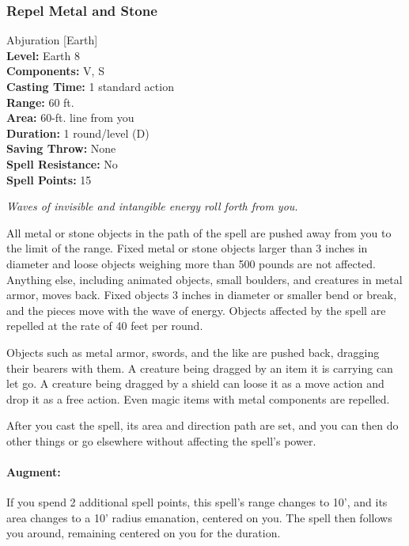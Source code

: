 \subsubsection{Repel Metal and Stone}
\label{Spell:RepelMetalAndStone}
Abjuration [Earth]
\\ \textbf{Level:} Earth 8
\\ \textbf{Components:} V, S
\\ \textbf{Casting Time:} 1 standard action
\\ \textbf{Range:} 60 ft.
\\ \textbf{Area:} 60-ft. line from you
\\ \textbf{Duration:} 1 round/level (D)
\\ \textbf{Saving Throw:} None
\\ \textbf{Spell Resistance:} No
\\ \textbf{Spell Points:} 15

\emph{Waves of invisible and intangible energy roll forth from you.}

All metal or stone objects in the path of the spell are pushed away from you to the limit of the range. 
Fixed metal or stone objects larger than 3 inches in diameter and loose objects weighing more than 500 pounds are not affected. 
Anything else, including animated objects, small boulders, and creatures in metal armor, moves back. 
Fixed objects 3 inches in diameter or smaller bend or break, and the pieces move with the wave of energy. 
Objects affected by the spell are repelled at the rate of 40 feet per round.

Objects such as metal armor, swords, and the like are pushed back, dragging their bearers with them. A creature being dragged by an item it is carrying can let go. A creature being dragged by a shield can loose it as a move action and drop it as a free action.
Even magic items with metal components are repelled.

After you cast the spell, its area and direction path are set, and you can then do other things or go elsewhere without affecting the spell's power.

\paragraph{Augment:} If you spend 2 additional spell points, this spell's range changes to 10', and its area changes to a 10' radius emanation, centered on you.
The spell then follows you around, remaining centered on you for the duration.

